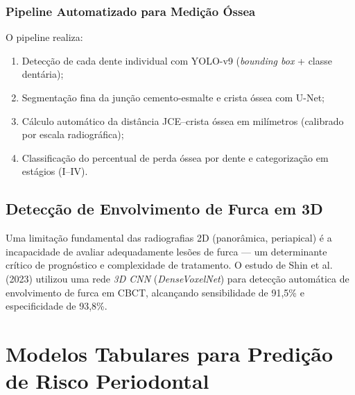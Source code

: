 \subsubsection{Pipeline Automatizado para Medição Óssea}

O pipeline realiza:
\begin{enumerate}
    \item Detecção de cada dente individual com YOLO-v9 (\textit{bounding box} + classe dentária);
    \item Segmentação fina da junção cemento-esmalte e crista óssea com U-Net;
    \item Cálculo automático da distância JCE--crista óssea em milímetros (calibrado por escala radiográfica);
    \item Classificação do percentual de perda óssea por dente e categorização em estágios (I--IV).
\end{enumerate}


\subsection{Detecção de Envolvimento de Furca em 3D}

Uma limitação fundamental das radiografias 2D (panorâmica, periapical) é a incapacidade de avaliar adequadamente lesões de furca --- um determinante crítico de prognóstico e complexidade de tratamento. O estudo de Shin et al. (2023) utilizou uma rede \textit{3D CNN} (\textit{DenseVoxelNet}) para detecção automática de envolvimento de furca em CBCT, alcançando sensibilidade de 91,5\% e especificidade de 93,8\%.


\section{Modelos Tabulares para Predição de Risco Periodontal}

